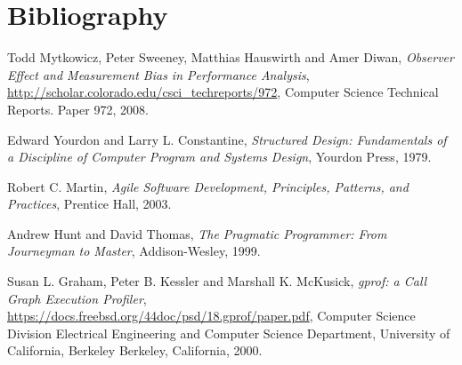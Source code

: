 \chapter{Bibliography}
\begin{thebibliography}{9}
            
  Todd Mytkowicz, Peter Sweeney, Matthias Hauswirth and Amer Diwan,
  \emph{Observer Effect and Measurement Bias in Performance Analysis},
  \url{http://scholar.colorado.edu/csci_techreports/972},
  Computer Science Technical Reports. Paper 972,
  2008.
      
  Edward Yourdon and Larry L. Constantine,
  \emph{Structured Design: Fundamentals of a Discipline of Computer Program and Systems Design},
  Yourdon Press,
  1979.
    
  Robert C. Martin,
  \emph{Agile Software Development, Principles, Patterns, and Practices},
  Prentice Hall,
  2003.
    
  Andrew Hunt and David Thomas,
  \emph{The Pragmatic Programmer: From Journeyman to Master},
  Addison-Wesley,
  1999.
            
  Susan L. Graham, Peter B. Kessler and Marshall K. McKusick,
  \emph{gprof: a Call Graph Execution Profiler},
  \url{https://docs.freebsd.org/44doc/psd/18.gprof/paper.pdf},
  Computer Science Division Electrical Engineering and Computer Science Department, University of California, Berkeley Berkeley, California,
  2000.
%            
\end{thebibliography}